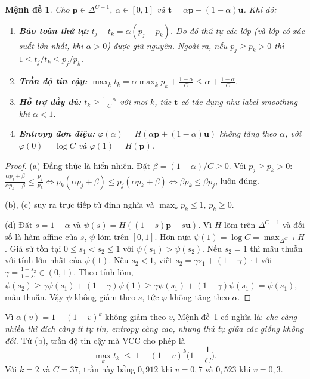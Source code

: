 \documentclass[11pt,a4paper]{article}
\theoremstyle{plain}
\newtheorem{proposition}{Mệnh đề}
\theoremstyle{definition}
\theoremstyle{remark}
\newcommand{\Simplex}{\Delta^{C-1}}
\newcommand{\bp}{\bm{p}}
\newcommand{\bt}{\bm{t}}
\newcommand{\bu}{\bm{u}}
\begin{document}
\begin{proposition}
\label{prop:props}
Cho $\bp\in\Simplex$, $\alpha\in[0,1]$ và $\bt=\alpha\bp+(1-\alpha)\bu$. Khi đó:
\begin{enumerate}[label=(\alph*),itemsep=2pt]
  \item \textbf{Bảo toàn thứ tự:} $t_j-t_k=\alpha(p_j-p_k)$. Do đó thứ tự các lớp (và lớp có xác suất lớn nhất, khi $\alpha>0$) được giữ nguyên. Ngoài ra, nếu $p_j\ge p_k>0$ thì $1\le t_j/t_k\le p_j/p_k$.
  \item \textbf{Trần độ tin cậy:} $\max_k t_k=\alpha\max_k p_k+\frac{1-\alpha}{C}\le\alpha+\frac{1-\alpha}{C}$.
  \item \textbf{Hỗ trợ đầy đủ:} $t_k\ge\frac{1-\alpha}{C}$ với mọi $k$, tức $\bt$ có tác dụng như label smoothing khi $\alpha<1$.
  \item \textbf{Entropy đơn điệu:} $\varphi(\alpha)=H(\alpha\bp+(1-\alpha)\bu)$ không tăng theo $\alpha$, với $\varphi(0)=\log C$ và $\varphi(1)=H(\bp)$.
\end{enumerate}
\end{proposition}
\begin{proof}
(a) Đẳng thức là hiển nhiên. Đặt $\beta=(1-\alpha)/C\ge0$. Với $p_j\ge p_k>0$:
$\frac{\alpha p_j+\beta}{\alpha p_k+\beta}\le\frac{p_j}{p_k}\iff p_k(\alpha p_j+\beta)\le p_j(\alpha p_k+\beta)\iff\beta p_k\le\beta p_j$, luôn đúng.

(b), (c) suy ra trực tiếp từ định nghĩa và $\max_k p_k\le1$, $p_k\ge0$.

(d) Đặt $s=1-\alpha$ và $\psi(s)=H((1-s)\bp+s\bu)$. Vì $H$ lõm trên $\Simplex$ và đối số là hàm affine của $s$, $\psi$ lõm trên $[0,1]$. Hơn nữa $\psi(1)=\log C=\max_{\Simplex}H$. Giả sử tồn tại $0\le s_1<s_2\le1$ với $\psi(s_1)>\psi(s_2)$. Nếu $s_2=1$ thì mâu thuẫn với tính lớn nhất của $\psi(1)$. Nếu $s_2<1$, viết $s_2=\gamma s_1+(1-\gamma)\cdot1$ với $\gamma=\frac{1-s_2}{1-s_1}\in(0,1)$. Theo tính lõm,
$\psi(s_2)\ge\gamma\psi(s_1)+(1-\gamma)\psi(1)\ge\gamma\psi(s_1)+(1-\gamma)\psi(s_1)=\psi(s_1)$, mâu thuẫn. Vậy $\psi$ không giảm theo $s$, tức $\varphi$ không tăng theo $\alpha$.
\end{proof}

Vì $\alpha(v)=1-(1-v)^k$ không giảm theo $v$, Mệnh đề~\ref{prop:props} có nghĩa là: \emph{che càng nhiều thì đích càng ít tự tin, entropy càng cao, nhưng thứ tự giữa các giống không đổi.} Từ (b), trần độ tin cậy mà VCC cho phép là
\begin{equation}
  \label{eq:cap}
  \max_k t_k\;\le\;1-(1-v)^k\Big(1-\frac1C\Big).
\end{equation}
Với $k=2$ và $C=37$, trần này bằng $0{,}912$ khi $v=0{,}7$ và $0{,}523$ khi $v=0{,}3$.
\end{document}
